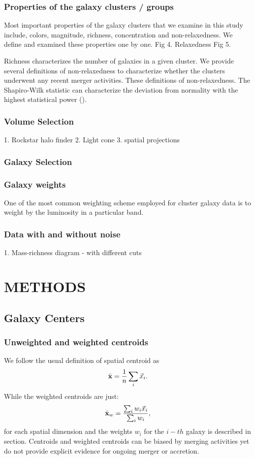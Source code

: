 \documentclass[letterpaper,useAMS,usenatbib]{mn2e}
\begin{document}
\subsubsection{Properties of the galaxy clusters / groups}
Most important properties of the galaxy clusters that we examine in this
study include, colors, magnitude, richness, concentration and non-relaxedness. We define
and examined these properties one by one. 
Fig 4. Relaxedness 
Fig 5. 

Richness characterizes the number of galaxies in a given cluster.
We provide several definitions of non-relaxedness to characterize whether
the clusters underwent any recent merger activities. These definitions of
non-relaxedness.
The Shapiro-Wilk statistic can characterize the deviation from normality
with the highest statistical power ().


\subsubsection{Volume Selection}
1. Rockstar halo finder 
2. Light cone 
3. spatial projections 
\subsubsection{Galaxy Selection}
\subsubsection{Galaxy weights}
One of the most common weighting scheme employed for cluster galaxy data is to weight
by the luminosity in a particular band.

\subsubsection{Data with and without noise}
1. Mass-richness diagram - with different cuts  
\section{METHODS} 

\subsection{Galaxy Centers}
\subsubsection{Unweighted and weighted centroids}
We follow the usual definition of spatial centroid as 
\begin{equation}
	\bar{\bf x} = \frac{1}{n} \sum_i \vec{x}_i. 
\end{equation}
While the weighted centroids are just: 
\begin{equation}
	\bar{\bf x}_w = \frac{\sum_i w_i \vec{x}_i}{\sum_i w_i},
\end{equation}
for each spatial dimension and the weights $w_i$ for the $i-th$ galaxy
is described in section.
Centroids and weighted centroids can be biased by merging activities yet do
not provide explicit evidence for ongoing merger or accretion. 
\end{document}
